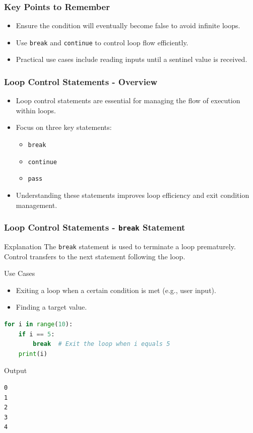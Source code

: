 \documentclass{beamer}
\begin{document}
\begin{frame}
    \frametitle{Key Points to Remember}
    \begin{itemize}
        \item Ensure the condition will eventually become false to avoid infinite loops.
        \item Use \texttt{break} and \texttt{continue} to control loop flow efficiently.
        \item Practical use cases include reading inputs until a sentinel value is received.
    \end{itemize}
\end{frame}

\begin{frame}[fragile]
    \frametitle{Loop Control Statements - Overview}
    \begin{itemize}
        \item Loop control statements are essential for managing the flow of execution within loops.
        \item Focus on three key statements:
            \begin{itemize}
                \item \texttt{break}
                \item \texttt{continue}
                \item \texttt{pass}
            \end{itemize}
        \item Understanding these statements improves loop efficiency and exit condition management.
    \end{itemize}
\end{frame}

\begin{frame}[fragile]
    \frametitle{Loop Control Statements - \texttt{break} Statement}
    \begin{block}{Explanation}
        The \texttt{break} statement is used to terminate a loop prematurely. Control transfers to the next statement following the loop.
    \end{block}
    
    \begin{block}{Use Cases}
        \begin{itemize}
            \item Exiting a loop when a certain condition is met (e.g., user input).
            \item Finding a target value.
        \end{itemize}
    \end{block}
    
    \begin{lstlisting}[language=Python]
for i in range(10):
    if i == 5:
        break  # Exit the loop when i equals 5
    print(i)
    \end{lstlisting}
    
    \begin{block}{Output}
        \begin{verbatim}
0
1
2
3
4
        \end{verbatim}
    \end{block}
\end{frame}
\end{document}
